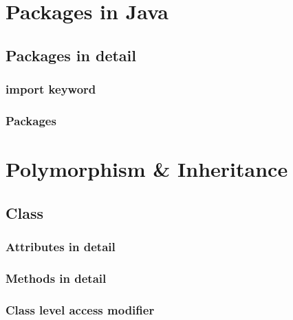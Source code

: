\documentclass[14pt,fleqn]{extbook} %
\begin{document}
\chapter{Packages in Java}
\section{Packages in detail}

\subsection{import keyword}

%
\subsection{Packages}


\chapter{Polymorphism \& Inheritance}
\section{Class}

\subsection{Attributes in detail}

\subsection{Methods in detail}

\subsection{Class level access modifier}

\end{document}

